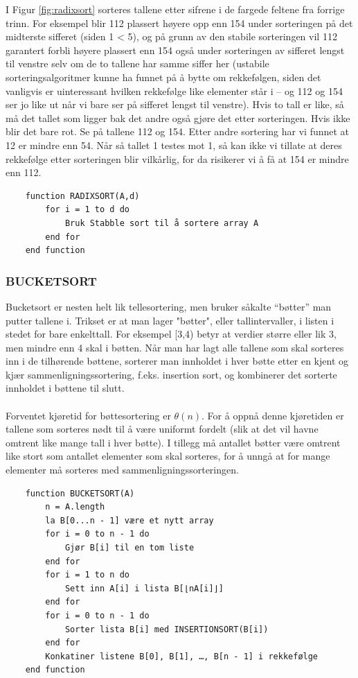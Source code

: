 \noindent I Figur \ref{fig:radixsort} sorteres tallene etter sifrene i de fargede feltene fra forrige trinn. For eksempel blir 112 plassert høyere opp enn 154 under sorteringen på det midterste sifferet (siden 1 < 5), og på grunn av den stabile sorteringen vil 112 garantert forbli høyere plassert enn 154 også under sorteringen av sifferet lengst til venstre selv om de to tallene har samme siffer her (ustabile sorteringsalgoritmer kunne ha funnet på å bytte om rekkefølgen, siden det vanligvis er uinteressant hvilken rekkefølge like elementer står i – og 112 og 154 ser jo like ut når vi bare ser på sifferet lengst til venstre). Hvis to tall er like, så må det tallet som ligger bak det andre også gjøre det etter sorteringen. Hvis ikke blir det bare rot. Se på tallene 112 og 154. Etter andre sortering har vi funnet at 12 er mindre enn 54. Når så tallet 1 testes mot 1, så kan ikke vi tillate at deres rekkefølge etter sorteringen blir vilkårlig, for da risikerer vi å få at 154 er mindre enn 112.

\begin{lstlisting}
    function RADIXSORT(A,d)
    	for i = 1 to d do
    		Bruk Stabble sort til å sortere array A
    	end for
    end function
\end{lstlisting}

\subsubsection{BUCKETSORT}
Bucketsort er nesten helt lik tellesortering, men bruker såkalte “bøtter” man putter tallene i. Trikset er at man lager "bøtter", eller tallintervaller, i listen i stedet for bare enkelttall. For eksempel [3,4) betyr at verdier større eller lik 3, men mindre enn 4 skal i bøtten. Når man har lagt alle tallene som skal sorteres inn i de tilhørende bøttene, sorterer man innholdet i hver bøtte etter en kjent og kjær sammenligningssortering, f.eks. insertion sort, og kombinerer det sorterte innholdet i bøttene til slutt.
\\\\
Forventet kjøretid for bøttesortering er $\theta(n)$. For å oppnå denne kjøretiden er tallene som sorteres nødt til å være uniformt fordelt (slik at det vil havne omtrent like mange tall i hver bøtte). I tillegg må antallet bøtter være omtrent like stort som antallet elementer som skal sorteres, for å unngå at for mange elementer må sorteres med sammenligningssorteringen.

\begin{lstlisting}
    function BUCKETSORT(A)
	    n = A.length
	    la B[0...n - 1] være et nytt array
	    for i = 0 to n - 1 do
	    	Gjør B[i] til en tom liste
	    end for
	    for i = 1 to n do
    		Sett inn A[i] i lista B[⌊nA[i]⌋]
    	end for
	    for i = 0 to n - 1 do
		    Sorter lista B[i] med INSERTIONSORT(B[i])
	    end for
	    Konkatiner listene B[0], B[1], …, B[n - 1] i rekkefølge
    end function
\end{lstlisting}

